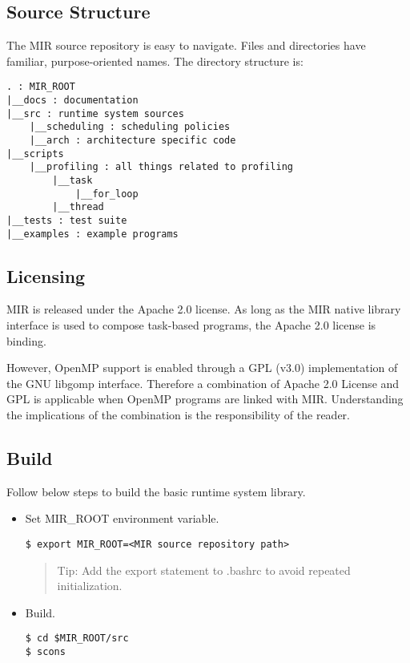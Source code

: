 \documentclass[11pt,a4paper]{article}
\begin{document}
\subsection{Source Structure}\label{source-structure}

The MIR source repository is easy to navigate. Files and directories have familiar, purpose-oriented names. The directory structure is:

\begin{lstlisting}[style=MyInputStyle]
. : MIR_ROOT
|__docs : documentation
|__src : runtime system sources
    |__scheduling : scheduling policies
    |__arch : architecture specific code
|__scripts
    |__profiling : all things related to profiling
        |__task
            |__for_loop
        |__thread
|__tests : test suite
|__examples : example programs
\end{lstlisting}

\subsection{Licensing}\label{license}
MIR is released under the Apache 2.0 license.  As long as the MIR native library interface is used to compose task-based programs, the Apache 2.0 license is binding.

However, OpenMP support is enabled through a GPL (v3.0) implementation of the GNU libgomp interface. Therefore a combination of Apache 2.0 License and GPL is applicable when OpenMP programs are linked with MIR. Understanding the implications of the combination is the responsibility of the reader.

\subsection{Build}\label{build}

Follow below steps to build the basic runtime system library.

\begin{itemize}
    \item Set MIR\_ROOT environment variable.

\begin{lstlisting}[style=MyInputStyle]
$ export MIR_ROOT=<MIR source repository path>
\end{lstlisting}

\begin{framed}
\begin{quote}
Tip: Add the export statement to .bashrc to avoid repeated initialization.
\end{quote}
\end{framed}

    \item Build.

\begin{lstlisting}[style=MyInputStyle]
$ cd $MIR_ROOT/src
$ scons
\end{lstlisting}
\end{itemize}
\end{document}
